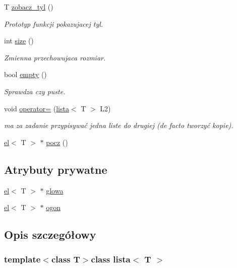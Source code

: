 \begin{DoxyCompactItemize}
\-T \hyperlink{classlista_aee86ec21992502a4cd67f8df38f37886}{zobacz\-\_\-tyl} ()
\begin{DoxyCompactList}\small\item\em \-Prototyp funkcji pokazujacej tyl. \end{DoxyCompactList}\item 
int \hyperlink{classlista_a71ac53823aaa5f53d06de4d69910ef9a}{size} ()
\begin{DoxyCompactList}\small\item\em \-Zmienna przechowujaca rozmiar. \end{DoxyCompactList}\item 
bool \hyperlink{classlista_a60113cb7fe7aa3bbf0e02e7bc5673adb}{empty} ()
\begin{DoxyCompactList}\small\item\em \-Sprawdza czy puste. \end{DoxyCompactList}\item 
void \hyperlink{classlista_a34b6928b48bb770cf37ab65394385637}{operator=} (\hyperlink{classlista}{lista}$<$ \-T $>$ \-L2)
\begin{DoxyCompactList}\small\item\em ma za zadanie przypisywać jedna liste do drugiej (de facto tworzyć kopie). \end{DoxyCompactList}\item 
\hyperlink{classel}{el}$<$ \-T $>$ $\ast$ \hyperlink{classlista_af06eae49ae7e3923e2c7c9fbbd46867b}{pocz} ()
\end{DoxyCompactItemize}
\subsection*{\-Atrybuty prywatne}
\begin{DoxyCompactItemize}
\item 
\hyperlink{classel}{el}$<$ \-T $>$ $\ast$ \hyperlink{classlista_ad344760a763e8d9818f9b60bc0e48ba6}{glowa}
\item 
\hyperlink{classel}{el}$<$ \-T $>$ $\ast$ \hyperlink{classlista_a9767a33d79ab3dbba6c82d74f518fc46}{ogon}
\end{DoxyCompactItemize}


\subsection{\-Opis szczegółowy}
\subsubsection*{template$<$class \-T$>$class lista$<$ T $>$}



